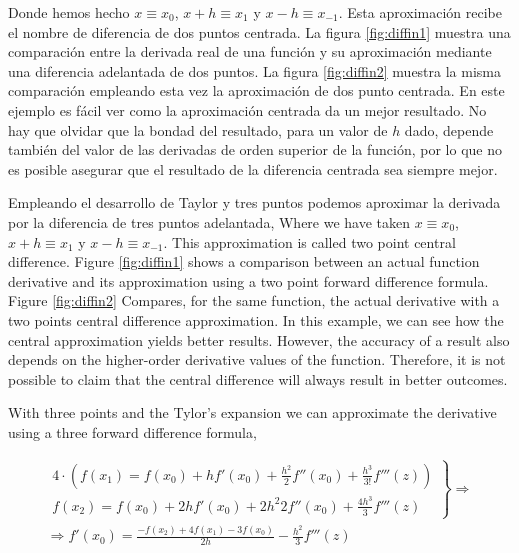 \begin{paracol}{2}
Donde hemos hecho $x\equiv x_0$, $x+h\equiv x_1$ y $x-h\equiv x_{-1}$. Esta aproximación recibe el nombre de diferencia de dos puntos centrada. La figura \ref{fig:diffin1} muestra una comparación entre la derivada real de una función y su aproximación mediante una diferencia adelantada de dos puntos. La figura \ref{fig:diffin2} muestra la misma comparación empleando esta vez la aproximación de dos punto centrada. En este ejemplo es fácil ver como la aproximación centrada da un mejor resultado. No hay que olvidar que  la bondad del resultado, para un valor de $h$ dado, depende también del valor de las derivadas de orden superior de la función, por lo que no es posible asegurar que el resultado de la diferencia centrada sea siempre mejor.

Empleando el desarrollo de Taylor y tres puntos podemos aproximar la derivada por la diferencia de tres puntos adelantada,
\switchcolumn
Where we have taken $x\equiv x_0$, $x+h\equiv x_1$ y $x-h\equiv x_{-1}$. This approximation is called two point central difference. Figure \ref{fig:diffin1} shows a comparison between an actual function derivative and its approximation using a two point forward difference formula. Figure \ref{fig:diffin2} Compares, for the same function, the actual derivative with a two points central difference approximation. In this example, we can see how the central approximation yields better results. However, the accuracy of a result also depends on the higher-order derivative values of the function.  Therefore, it is not possible to claim that the central difference will always result in better outcomes.

 With three points and the Tylor's expansion we can approximate the derivative using a three forward difference formula,   
\end{paracol}
\begin{align*}
\left. \begin{aligned}
4\cdot\left(f(x_1)=f(x_0)+hf'(x_0)+\frac{h^2}{2}f''(x_0)+\frac{h^3}{3!}f'''(z)\right)\\
f(x_2)=f(x_0)+2hf'(x_0)+2{h^2}{2}f''(x_0)+\frac{4h^3}{3}f'''(z)
\end{aligned} \right\rbrace \Rightarrow \\
\Rightarrow f'(x_0)=\frac{-f(x_2)+4f(x_1)-3f(x_0)}{2h}-\frac{h^2}{3}f'''(z) 
\end{align*} 
